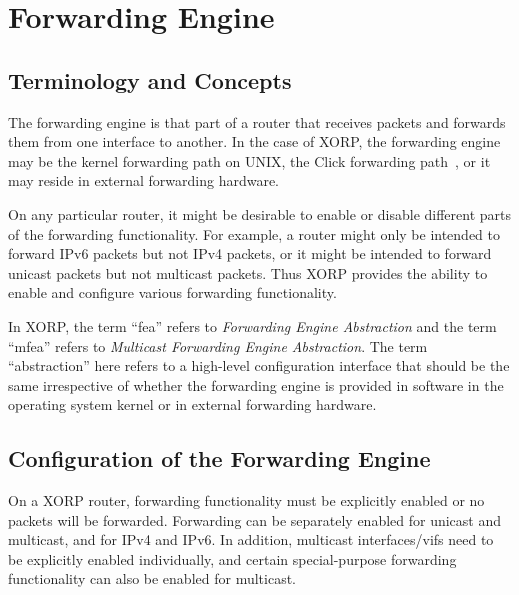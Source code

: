 %
%

\chapter{Forwarding Engine}

\section{Terminology and Concepts}

The forwarding engine is that part of a router that receives packets
and forwards them from one interface to another.  In the case of XORP,
the forwarding engine may be the kernel forwarding path on UNIX,
the Click forwarding path~\cite{CLICK-PROJECT}, or it may reside in
external forwarding hardware.

On any particular router, it might be desirable to enable or disable
different parts of the forwarding functionality.  For example, a
router might only be intended to forward IPv6 packets but not IPv4
packets, or it might be intended to forward unicast packets but not
multicast packets.  Thus XORP provides the ability to enable and
configure various forwarding functionality.

In XORP, the term ``{\stt fea}'' refers to {\it Forwarding Engine
Abstraction} and the term ``{\stt mfea}'' refers to {\it Multicast
Forwarding Engine Abstraction}.  The term ``abstraction'' here refers to
a high-level configuration interface that should be the same
irrespective of whether the forwarding engine is provided in software
in the operating system kernel or in external forwarding hardware.

\newpage
\section{Configuration of the Forwarding Engine}

On a XORP router, forwarding functionality must be explicitly enabled
or no packets will be forwarded.  Forwarding can be separately enabled
for unicast and multicast, and for IPv4 and IPv6.  In addition,
multicast interfaces/vifs need to be explicitly enabled individually,
and certain special-purpose forwarding functionality can also be
enabled for multicast.

